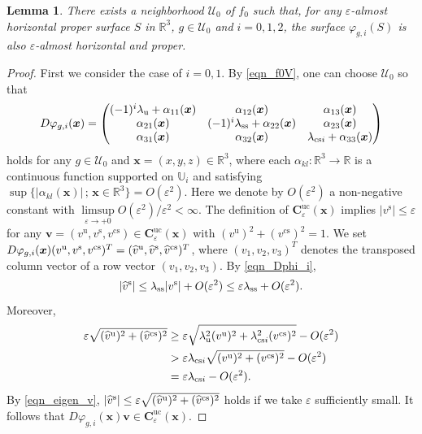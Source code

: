 \documentclass{amsart}
\theoremstyle{plain}
\newtheorem{lem}[thm]{Lemma}
\theoremstyle{definition}
\theoremstyle{remark}
\numberwithin{equation}{section}
\def\bx{{\boldsymbol{x}}}
\def\bv{{\boldsymbol{v}}}
\begin{document}
\begin{lem}\label{l_ea_horizontal}
There exists a neighborhood $\mathcal{U}_0$ of $f_0$ such that, 
for any $\varepsilon$-almost horizontal proper surface $S$ in $\mathbb{R}^3$, $g\in\mathcal{U}_0$ and $i=0,1,2$, 
the surface 
$\varphi_{g,i}(S)$ is also $\varepsilon$-almost horizontal and proper.
\end{lem}
\begin{proof}
First we consider the case of $i=0,1$.
By \eqref{eqn_f0V}, one can choose $\mathcal{U}_0$ so that 
\begin{equation}\label{eqn_Dphi_i}
D\varphi_{g,i}(\bx)=
\begin{pmatrix} (-1)^i\lambda_{\rm u}+\alpha_{11}(\bx)& \alpha_{12}(\bx)& \alpha_{13}(\bx)\\
\alpha_{21}(\bx)&(-1)^i \lambda_{\rm ss}+\alpha_{22}(\bx)& \alpha_{23}(\bx)\\
\alpha_{31}(\bx)& \alpha_{32}(\bx) &\lambda_{{\rm cs}i}+\alpha_{33}(\bx)
\end{pmatrix}
\end{equation}
holds for any $g\in\mathcal{U}_0$ and $\bx=(x,y,z)\in \mathbb{R}^3$,  
where each $\alpha_{kl}:\mathbb{R}^3\longrightarrow \mathbb{R}$ is a continuous function supported on $\mathbb{U}_i$ and satisfying  
$\sup\bigl\{|\alpha_{kl}(\bx)|\, ;\, \bx \in \mathbb{R}^3\bigr\}=O(\varepsilon^2)$.
Here we denote by $O(\varepsilon^2)$ a non-negative constant with $\limsup\limits_{\varepsilon\to +0}
O(\varepsilon^2)/\varepsilon^2<\infty$.
The definition of $\boldsymbol{C}_{\varepsilon}^{\mathrm{uc}}(\boldsymbol{x})$ 
implies $|v^{\mathrm{s}}|\leq \varepsilon$ for any $\bv=(v^{\mathrm{u}},v^{\mathrm{s}},v^{\mathrm{cs}})\in 
\boldsymbol{C}_{\varepsilon}^{\mathrm{uc}}(\boldsymbol{x})$ with 
$(v^{\mathrm{u}})^2+(v^{\mathrm{cs}})^2=1$.
We set $D\varphi_{g,i}(\bx)(v^{\rm u},v^{\rm s},v^{\rm cs})^T
=(\widehat{v}^{\rm u},\widehat{v}^{\rm s},\widehat{v}^{\rm cs})^T$, 
where $(v_1,v_2,v_3)^T$ denotes the transposed column vector of a row vector $(v_1,v_2,v_3)$.
By \eqref{eqn_Dphi_i}, 
\[
|\widehat{v}^{\rm s}|\leq \lambda_{\rm ss}|v^{\rm s}|+O(\varepsilon^2)
\leq \varepsilon\lambda_{\rm ss}+O(\varepsilon^2).
\]
Moreover, 
\begin{align*}
\varepsilon\sqrt{(\widehat{v}^{\rm u})^2+(\widehat{v}^{\rm cs})^2}
&\geq 
\varepsilon\sqrt{\lambda_{\rm u}^2(v^{\rm u})^2+\lambda_{{\rm cs}i}^2(v^{\rm cs})^2}-O(\varepsilon^2)\\
&>\varepsilon\lambda_{{\rm cs}i}\sqrt{(v^{\rm u})^2+(v^{\rm cs})^2}-O(\varepsilon^2)\\
&
=\varepsilon\lambda_{{\rm cs}i}-O(\varepsilon^2).
\end{align*}
By \eqref{eqn_eigen_v},   
$|\widehat{v}^{\rm s}|\leq \varepsilon\sqrt{(\widehat{v}^{\rm u})^2+(\widehat{v}^{\rm cs})^2}$ holds 
if we take $\varepsilon$ sufficiently small.
It follows that $D\varphi_{g,i}(\bx)\bv\in \boldsymbol{C}_{\varepsilon}^{\mathrm{uc}}(\boldsymbol{x})$.





\end{proof}
\end{document}
